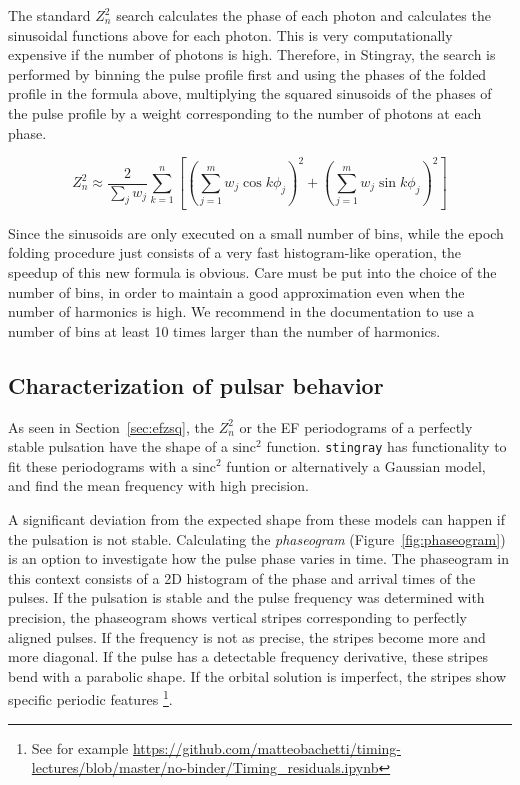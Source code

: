 \documentclass[twocolumn]{aastex62}
\newcommand{\zsq}{\ensuremath{Z^2_n}\xspace}
\newcommand{\stingray}{\texttt{stingray}\xspace}
\begin{document}
The standard \zsq search calculates the phase of each photon and calculates the sinusoidal functions above for each photon.
This is very computationally expensive if the number of photons is high. 
Therefore, in Stingray, the search is performed by binning the pulse profile first and using the phases of the folded profile in the formula above, multiplying the squared sinusoids of the phases of the pulse profile by a weight corresponding to the number of photons at each phase.

\begin{equation}
\zsq \approx \dfrac{2}{\sum_j{w_j}} \sum_{k=1}^n \left[{\left(\sum_{j=1}^m w_j \cos k \phi_j\right)}^2 + {\left(\sum_{j=1}^m w_j \sin k \phi_j\right)}^2\right]
\end{equation}

Since the sinusoids are only executed on a small number of bins, while the epoch folding procedure just consists of a very fast histogram-like operation, the speedup of this new formula is obvious. 
Care must be put into the choice of the number of bins, in order to maintain a good approximation even when the number of harmonics is high. 
We recommend in the documentation to use a number of bins at least 10 times larger than the number of harmonics.

\subsection{Characterization of pulsar behavior}
\label{sec:ephem}
As seen in Section~\ref{sec:efzsq}, the \zsq or the EF periodograms of a perfectly stable pulsation have the shape of a $\mathrm{sinc}^2$ function.
\stingray has functionality to fit these periodograms with a $\mathrm{sinc}^2$ funtion or alternatively a Gaussian model, and find the mean frequency with high precision.

A significant deviation from the expected shape from these models can happen if the pulsation is not stable.
Calculating the \textit{phaseogram} (Figure~\ref{fig:phaseogram}) is an option to investigate how the pulse phase varies in time.
The phaseogram in this context consists of a 2D histogram of the phase and arrival times of the pulses. 
If the pulsation is stable and the pulse frequency was determined with precision, the phaseogram shows vertical stripes corresponding to perfectly aligned pulses.
If the frequency is not as precise, the stripes become more and more diagonal.
If the pulse has a detectable frequency derivative, these stripes bend with a parabolic shape.
If the orbital solution is imperfect, the stripes show specific periodic features \footnote{See for example \url{https://github.com/matteobachetti/timing-lectures/blob/master/no-binder/Timing_residuals.ipynb}}.
\end{document}
